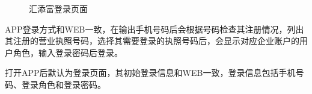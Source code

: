 
\begin{figure}[htbp!]
	\centering
	\caption{汇添富登录页面}
\end{figure}

APP登录方式和WEB一致，在输出手机号码后会根据号码检查其注册情况，列出其注册的营业执照号码，选择其需要登录的执照号码后，会显示对应企业账户的用户角色，输入登录密码后登录。\par

打开APP后默认为登录页面，其初始登录信息和WEB一致，登录信息包括手机号码、登录角色和登录密码。\par

